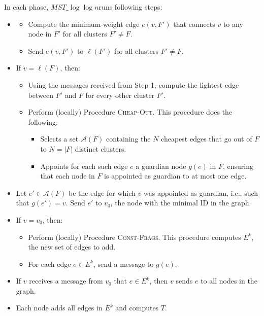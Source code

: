 \documentclass[english, 12pt, a4paper, elec, utf8, a-2b, online]{aaltothesis}
\newcommand{\mstalgo}{$MST\_\log\log{n}$}
\begin{document}
In each phase, \mstalgo runs following steps:
\begin{itemize}
	\item[1.] 
	\begin{itemize}
			\item[(a)] Compute the minimum-weight edge $e(v, F')$ that connects $v$ to any node in $F'$ for all clusters $F' \neq F$.
			\item[(b)] Send $e(v, F')$ to $\ell(F')$ for all clusters $F' \neq F$.
	\end{itemize}

	\item[2.] If $v = \ell(F)$, then:
	\begin{itemize}
			\item[(a)] Using the messages received from Step 1, compute the lightest edge between $F'$ and $F$ for every other cluster $F'$.
			\item[(b)] Perform (locally) Procedure \textsc{Cheap-Out}. This procedure does the following:
			\begin{itemize}
					\item Selects a set $\mathcal{A}(F)$ containing the $N$ cheapest edges that go out of $F$ to $N = |F|$ distinct clusters.
					\item Appoints for each such edge $e$ a guardian node $g(e)$ in $F$, ensuring that each node in $F$ is appointed as guardian to at most one edge.
			\end{itemize}
	\end{itemize}

	\item[3.] Let $e' \in \mathcal{A}(F)$ be the edge for which $v$ was appointed as guardian, i.e., such that $g(e') = v$. Send $e'$ to $v_0$, the node with the minimal ID in the graph.
	
	\item[4.] If $v = v_0$, then:
	\begin{itemize}
			\item[(a)] Perform (locally) Procedure \textsc{Const-Frags}. This procedure computes $E^k$, the new set of edges to add.
			\item[(b)] For each edge $e \in E^k$, send a message to $g(e)$.
	\end{itemize}

	\item[5.] If $v$ receives a message from $v_0$ that $e \in E^k$, then $v$ sends $e$ to all nodes in the graph.

	\item[6.] Each node adds all edges in $E^k$ and computes $T$.
\end{itemize}
\end{document}

